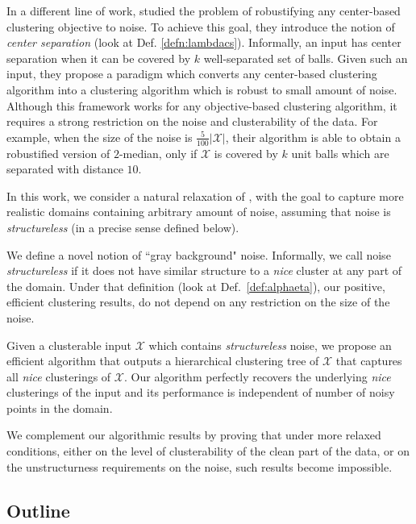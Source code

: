 \documentclass[anon,12pt]{colt2016} %
\newcommand{\mc}{\mathcal}
\begin{document}
In a different line of work, \cite{ben2014clustering} studied the problem of robustifying any center-based clustering objective to noise. To achieve this goal, they introduce the notion of {\em center separation} (look at Def. \ref{defn:lambdacs}). Informally, an input has center separation when it can be covered by $k$ well-separated set of balls.
Given such an input, they propose a paradigm which converts any center-based clustering algorithm into a clustering algorithm which is robust to small amount of noise.
Although this framework works for any objective-based clustering algorithm, it requires a strong restriction on the noise and clusterability of the data. For example, when the size of the noise is $\frac{5}{100}|\mc X|$, their algorithm is able to obtain a robustified version of $2$-median, only if $\mc X$ is covered by $k$ unit balls which are separated with distance $10$. 


In this work, we consider a natural relaxation of \cite{balcan2012clustering, ben2014clustering}, with the goal to capture more realistic domains containing arbitrary amount of noise, assuming that noise is \emph{structureless} (in a precise sense defined below). 

We define a novel notion of ``gray background" noise. Informally, we call noise {\em structureless} if it does not have similar structure to a {\em nice} cluster at any part of the domain. Under that definition (look at Def.~\ref{def:alphaeta}), our positive, efficient clustering results, do not depend on any restriction on the size of the noise.

Given a clusterable input $\mc X$ which contains {\em structureless} noise, we propose an efficient algorithm that outputs a hierarchical clustering tree of $\mc X$ that captures all {\em nice} clusterings of $\mc X$. Our algorithm perfectly recovers the underlying {\em nice} clusterings of the input and its performance is independent of number of noisy points in the domain. 

We complement our algorithmic results by proving that under more relaxed conditions, either on the level of clusterability of the clean part of the data, or on the unstructurness requirements on the noise, such results become impossible. 


\subsection{Outline}
\end{document}
